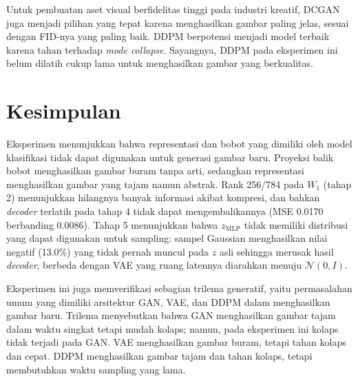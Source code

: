 \documentclass{article}
\begin{document}
Untuk pembuatan aset visual berfidelitas tinggi pada industri kreatif, DCGAN juga menjadi pilihan yang tepat karena menghasilkan gambar paling jelas, sesuai dengan FID-nya yang paling baik. DDPM berpotensi menjadi model terbaik karena tahan terhadap \textit{mode collapse}. Sayangnya, DDPM pada eksperimen ini belum dilatih cukup lama untuk menghasilkan gambar yang berkualitas.

\section{Kesimpulan}
Eksperimen menunjukkan bahwa representasi dan bobot yang dimiliki oleh model klasifikasi tidak dapat digunakan untuk generasi gambar baru. Proyeksi balik bobot menghasilkan gambar buram tanpa arti, sedangkan representasi menghasilkan gambar yang tajam namun abstrak. Rank 256/784 pada $W_1$ (tahap 2) menunjukkan hilangnya banyak informasi akibat kompresi, dan bahkan \textit{decoder} terlatih pada tahap 4 tidak dapat mengembalikannya (MSE 0.0170 berbanding 0.0086). Tahap 5 menunjukkan bahwa $z_{\text{MLP}}$ tidak memiliki distribusi yang dapat digunakan untuk sampling: sampel Gaussian menghasilkan nilai negatif (13.0\%) yang tidak pernah muncul pada $z$ asli sehingga merusak hasil \textit{decoder}, berbeda dengan VAE yang ruang latennya diarahkan menuju $\mathcal{N}(0,I)$.

Eksperimen ini juga memverifikasi sebagian trilema generatif, yaitu permasalahan umum yang dimiliki arsitektur GAN, VAE, dan DDPM dalam menghasilkan gambar baru. Trilema menyebutkan bahwa GAN menghasilkan gambar tajam dalam waktu singkat tetapi mudah kolaps; namun, pada eksperimen ini kolaps tidak terjadi pada GAN. VAE menghasilkan gambar buram, tetapi tahan kolaps dan cepat. DDPM menghasilkan gambar tajam dan tahan kolaps, tetapi membutuhkan waktu sampling yang lama.
\end{document}
